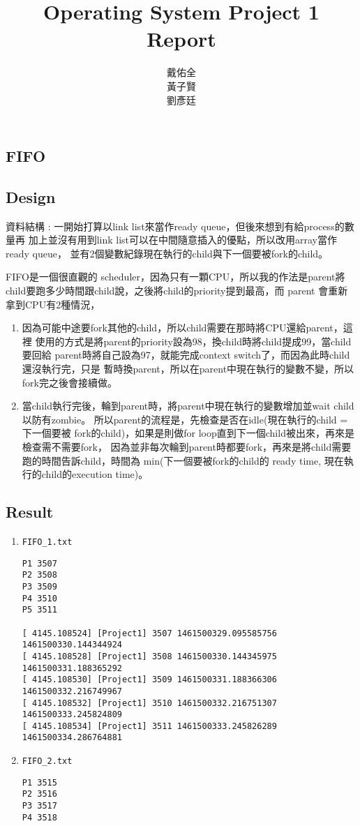 \documentclass{article}
\title{Operating System Project 1\\Report}
\author{戴佑全\\黃子賢\\劉彥廷}
\begin{document}
\begin{CJK}{UTF8}{bkai}
\maketitle

\section{FIFO}
\subsection{Design}

資料結構 : 一開始打算以link list來當作ready queue，但後來想到有給process的數量再
加上並沒有用到link list可以在中間隨意插入的優點，所以改用array當作ready queue，
並有2個變數紀錄現在執行的child與下一個要被fork的child。

FIFO是一個很直觀的 scheduler，因為只有一顆CPU，所以我的作法是parent將
child要跑多少時間跟child說，之後將child的priority提到最高，而 parent
會重新拿到CPU有2種情況，

\begin{enumerate}
  \item 因為可能中途要fork其他的child，所以child需要在那時將CPU還給parent，這裡
使用的方式是將parent的priority設為98，換child時將child提成99，當child要回給
parent時將自己設為97，就能完成context switch了，而因為此時child還沒執行完，只是
暫時換parent，所以在parent中現在執行的變數不變，所以fork完之後會接續做。
  \item 當child執行完後，輪到parent時，將parent中現在執行的變數增加並wait child
以防有zombie。 所以parent的流程是，先檢查是否在idle(現在執行的child = 下一個要被
fork的child)，如果是則做for loop直到下一個child被出來，再來是檢查需不需要fork，
因為並非每次輪到parent時都要fork，再來是將child需要跑的時間告訴child，時間為
min(下一個要被fork的child的 ready time, 現在執行的child的execution time)。
\end{enumerate}

\subsection{Result}

\begin{enumerate}
  \item \texttt{FIFO\_1.txt}
\begin{verbatim}
P1 3507
P2 3508
P3 3509
P4 3510
P5 3511

[ 4145.108524] [Project1] 3507 1461500329.095585756 1461500330.144344924
[ 4145.108528] [Project1] 3508 1461500330.144345975 1461500331.188365292
[ 4145.108530] [Project1] 3509 1461500331.188366306 1461500332.216749967
[ 4145.108532] [Project1] 3510 1461500332.216751307 1461500333.245824809
[ 4145.108534] [Project1] 3511 1461500333.245826289 1461500334.286764881
\end{verbatim}
  \item \texttt{FIFO\_2.txt}
\begin{verbatim}
P1 3515
P2 3516
P3 3517
P4 3518


\end{verbatim}
\end{enumerate}
\end{CJK}
\end{document}
